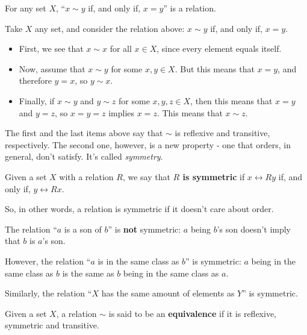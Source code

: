 \begin{prop}
	For any set $X$, ``$x\sim y$ if, and only if, $x=y$'' is a relation.
\end{prop}

\begin{ex}
	Take $X$ any set, and consider the relation above: $x\sim y$ if, and only if, $x=y$.
	
	\begin{itemize}
		\item First, we see that $x\sim x$ for all $x\in X$, since every element equals itself.
		
		\item Now, assume that $x\sim y$ for some $x,y\in X$. But this means that $x=y$, and therefore $y=x$, so $y\sim x$.
		
		\item Finally, if $x\sim y$ and $y\sim z$ for some $x,y,z\in X$, then this means that $x=y$ and $y=z$, so $x=y=z$ implies $x=z$. This means that $x\sim z$.
	\end{itemize}

	The first and the last items above say that $\sim$ is reflexive and transitive, respectively. The second one, however, is a new property - one that orders, in general, don't satisfy. It's called \textit{symmetry}.
\end{ex}

\begin{df}
	Given a set $X$ with a relation $R$, we say that \textbf{$R$ is symmetric} if $x\rel{R}y$ if, and only if, $y\rel{R}x$.
\end{df}

So, in other words, a relation is symmetric if it doesn't care about order.

\begin{ex}
	The relation ``$a$ is a son of $b$'' is \textbf{not} symmetric: $a$ being $b$'s son doesn't imply that $b$ is $a$'s son.
	
	However, the relation ``$a$ is in the same class as $b$'' is symmetric: $a$ being in the same class as $b$ is the same as $b$ being in the same class as $a$.
	
	Similarly, the relation ``$X$ has the same amount of elements as $Y$'' is symmetric.
\end{ex}

\begin{df}
	Given a set $X$, a relation $\sim$ is said to be an \textbf{equivalence} if it is reflexive, symmetric and transitive.
\end{df}

